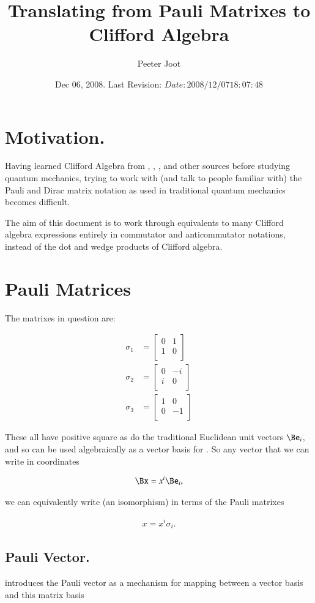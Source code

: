 \documentclass{article}
\title{Translating from Pauli Matrixes to Clifford Algebra}
\author{Peeter Joot}
\date{ Dec 06, 2008.  Last Revision: $Date: 2008/12/07 18:07:48 $ }
\newcommand{\PauliX}[0]{
\begin{bmatrix}
0 & 1 \\
1 & 0 \\
\end{bmatrix}
}
\newcommand{\PauliY}[0]{
\begin{bmatrix}
0 & -i \\
i & 0 \\
\end{bmatrix}
}
\newcommand{\PauliZ}[0]{
\begin{bmatrix}
1 & 0 \\
0 & -1 \\
\end{bmatrix}
}
\begin{document}
\maketitle{}

\tableofcontents

\section{ Motivation. }

Having learned Clifford Algebra from 
\cite{doran2003gap}, \cite{hestenes1999nfc}, \cite{dorst2007gac}, and other sources
before studying quantum mechanics, trying to work with (and talk to people familiar with) the Pauli and Dirac matrix notation as used in
traditional quantum mechanics becomes difficult.

The aim of this document is to work through equivalents to many Clifford algebra expressions entirely in
commutator and anticommutator notations, instead of the dot and wedge products of Clifford algebra.

\section{ Pauli Matrices }

The matrixes in question are:

\begin{align}
\sigma_1 &= \PauliX \\
\sigma_2 &= \PauliY \\
\sigma_3 &= \PauliZ
\end{align}

These all have positive square as do the traditional Euclidean unit vectors $\Be_i$, and so can be used algebraically as a vector basis for .  So any vector that we
can write in coordinates

\begin{align*}
\Bx = x^i \Be_i,
\end{align*}

we can equivalently write (an isomorphism) in terms of the Pauli matrixes

\begin{align}\label{eqn:vectorInPauliBasis}
x = x^i \sigma_i.
\end{align}

\subsection{ Pauli Vector. }
\cite{wikipauli} introduces the Pauli vector as a mechanism for mapping between a vector basis and this matrix basis
\end{document}
